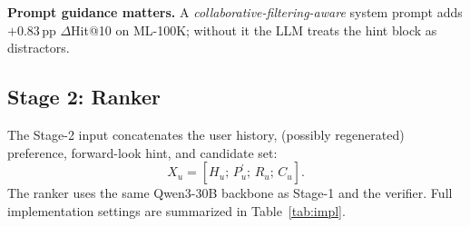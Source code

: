 \documentclass[11pt]{article}
\begin{document}
\textbf{Prompt guidance matters.}
A \textit{collaborative-filtering-aware} system prompt adds $+0.83$\,pp $\Delta$Hit@10 on ML-100K; without it the LLM treats the hint block as distractors.


\subsection{Stage 2: Ranker}
The Stage-2 input concatenates the user history, (possibly regenerated) preference, forward-look hint, and candidate set:
\begin{equation}
X_u = [H_u;\, P_u^{'};\, R_u;\, C_u].
\end{equation}
The ranker uses the same Qwen3-30B backbone as Stage-1 and the verifier.
Full implementation settings are summarized in Table~\ref{tab:impl}.

\begin{table}[!t]
\centering
\small
\caption{Implementation settings. The threshold sweep uses $T{=}0.7$ in a separate single-seed analysis, while Electronics regeneration uses $T{=}1.0$.}
\label{tab:impl}
\end{table}
\end{document}
